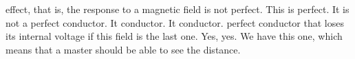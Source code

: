 effect, that is, the response to a magnetic field is not perfect. This is perfect. It is not a perfect conductor. It conductor. It conductor. perfect conductor that loses its internal voltage if this field is the last one. Yes, yes. We have this one, which means that a master should be able to see the distance.
